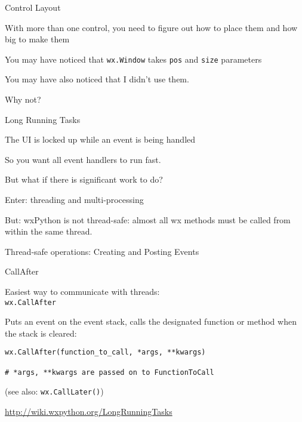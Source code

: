 \documentclass{beamer}
\begin{document}
\begin{frame}[fragile]{Control Layout}

{\Large With more than one control, you need to figure out how to place them 
and how big to make them}

\vfill
{\Large You may have noticed that \verb`wx.Window` takes \verb`pos` and \verb`size` parameters}

\vfill
{\Large You may have also noticed that I didn't use them.}

\vfill
{\Large Why not?}

\end{frame}

\begin{frame}[fragile]{Long Running Tasks}

\vfill
{\Large The UI is locked up while an event is being handled}

\vfill
{\Large So you want all event handlers to run fast.}

\vfill
{\Large But what if there is significant work to do?}

\vfill
{\Large Enter: threading and multi-processing}

\vfill
{\Large But: wxPython is not thread-safe: almost all wx methods must be called from within the same thread.}

\vfill
{\Large Thread-safe operations: Creating and Posting Events}


\end{frame}

\begin{frame}[fragile]{CallAfter}

\vfill
{\Large Easiest way to communicate with threads:\\
 \verb`wx.CallAfter`}

\vfill
{\Large Puts an event on the event stack, calls the designated function or method when the stack is cleared:}

\begin{verbatim}
wx.CallAfter(function_to_call, *args, **kwargs)

# *args, **kwargs are passed on to FunctionToCall
\end{verbatim}

{\large (see also: \verb`wx.CallLater()`) }

\vfill
\url{http://wiki.wxpython.org/LongRunningTasks}

\end{frame}
\end{document}
